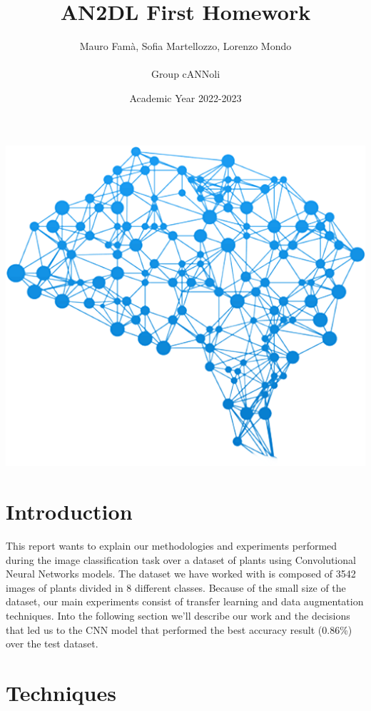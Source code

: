 \documentclass[11pt, oneside]{article}
\title{{\arial AN2DL First Homework}}
\author{{\calibri Mauro Famà,   Sofia Martellozzo,   Lorenzo Mondo\\ \\
        Group cANNoli}}
\date{Academic Year 2022-2023}
\begin{document}
\maketitle
\begin{center}
    \includegraphics[scale=0.43]{images/title.png}
\end{center}
\newpage
\vspace{.25in}


\section{Introduction}
This report wants to explain our methodologies and experiments performed during the image classification task over a dataset of plants using Convolutional Neural Networks models.
The dataset we have worked with is composed of 3542 images of plants divided in 8 different classes.
Because of the small size of the dataset, our main experiments consist of transfer learning and data augmentation techniques. Into the following section we'll describe our work and the decisions that led us to the CNN model that performed the best accuracy result (0.86\%) over the test dataset.
\section{Techniques}
\end{document}
